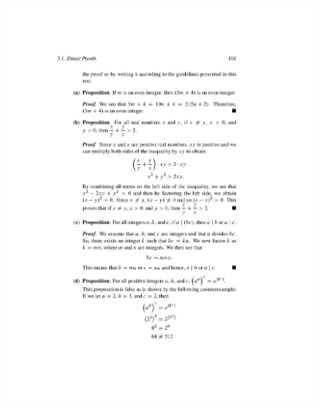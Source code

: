\documentclass[palatino]{beamer}
\begin{document}
\begin{frame}
	\begin{center}
		\includegraphics[width=4in]{exam1-proofanalysis3}
	\end{center}
\end{frame}
\end{document}
